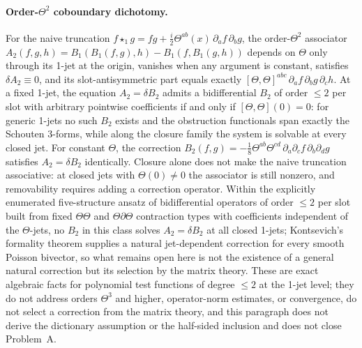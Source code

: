 \paragraph{Order-\(\Theta^2\) coboundary dichotomy.} For the naive truncation \(f\star_1 g=fg+\tfrac{i}{2}\Theta^{ab}(x)\,\partial_af\,\partial_bg\), the order-\(\Theta^2\) associator \(A_2(f,g,h)=B_1(B_1(f,g),h)-B_1(f,B_1(g,h))\) depends on \(\Theta\) only through its 1-jet at the origin, vanishes when any argument is constant, satisfies \(\delta A_2\equiv0\), and its slot-antisymmetric part equals exactly \([\Theta,\Theta]^{abc}\,\partial_af\,\partial_bg\,\partial_ch\). At a fixed 1-jet, the equation \(A_2=\delta B_2\) admits a bidifferential \(B_2\) of order \(\le2\) per slot with arbitrary pointwise coefficients if and only if \([\Theta,\Theta](0)=0\): for generic 1-jets no such \(B_2\) exists and the obstruction functionals span exactly the Schouten 3-forms, while along the closure family the system is solvable at every closed jet. For constant \(\Theta\), the correction \(B_2(f,g)=-\tfrac{1}{8}\Theta^{ab}\Theta^{cd}\,\partial_a\partial_c f\,\partial_b\partial_d g\) satisfies \(A_2=\delta B_2\) identically. Closure alone does not make the naive truncation associative: at closed jets with \(\Theta(0)\neq0\) the associator is still nonzero, and removability requires adding a correction operator. Within the explicitly enumerated five-structure ansatz of bidifferential operators of order \(\le2\) per slot built from fixed \(\Theta\Theta\) and \(\Theta\partial\Theta\) contraction types with coefficients independent of the \(\Theta\)-jets, no \(B_2\) in this class solves \(A_2=\delta B_2\) at all closed 1-jets; Kontsevich's formality theorem supplies a natural jet-dependent correction for every smooth Poisson bivector, so what remains open here is not the existence of a general natural correction but its selection by the matrix theory. These are exact algebraic facts for polynomial test functions of degree \(\le2\) at the 1-jet level; they do not address orders \(\Theta^3\) and higher, operator-norm estimates, or convergence, do not select a correction from the matrix theory, and this paragraph does not derive the dictionary assumption or the half-sided inclusion and does not close Problem~A.

